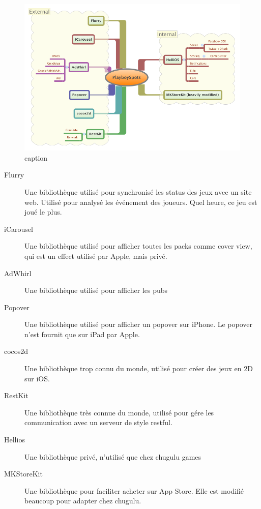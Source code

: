 \begin{figure}[htbp]
	\centering
		\includegraphics[width=7in]{XMinds/PlayboySpotsAppExternals.png}
	\caption{caption}
	\label{fig:XMinds_PlayboySpotsAppExternals}
\end{figure}

\begin{description}
	\item[Flurry] Une bibliothèque utilisé pour synchronisé les status des jeux avec un site web. Utilisé pour analysé les événement des joueurs. Quel heure, ce jeu est joué le plus.
	\item[iCarousel] Une bibliothèque utilisé pour afficher toutes les packs comme cover view, qui est un effect utilisé par Apple, mais privé.
	\item[AdWhirl] Une bibliothèque utilisé pour afficher les pubs
	\item[Popover] Une bibliothèque utilisé pour afficher un popover sur iPhone. Le popover n'est fournit que sur iPad par Apple.
	\item[cocos2d] Une bibliothèque trop connu du monde, utilisé pour créer des jeux en 2D sur iOS.
	\item[RestKit] Une bibliothèque très connue du monde, utilisé pour gére les communication avec un serveur de style restful.
	\item[Hellios] Une bibliothèque privé, n'utilisé que chez chugulu games
	\item[MKStoreKit] Une bibliothèque pour faciliter acheter sur App Store. Elle est modifié beaucoup pour adapter chez chugulu.
\end{description}




